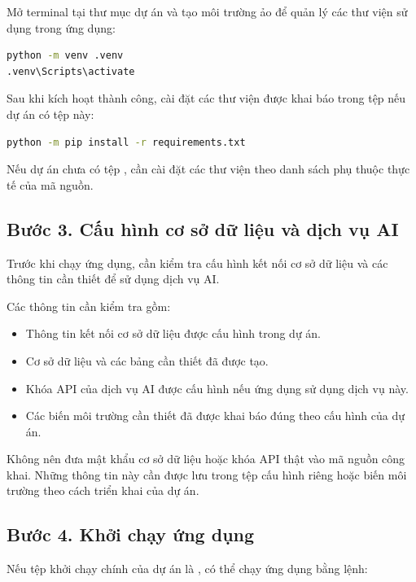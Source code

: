 Mở terminal tại thư mục dự án và tạo môi trường ảo để quản lý các
thư viện sử dụng trong ứng dụng:

\begin{lstlisting}[language=bash, caption={Tạo và kích hoạt môi trường ảo}]
python -m venv .venv
.venv\Scripts\activate
\end{lstlisting}

Sau khi kích hoạt thành công, cài đặt các thư viện được khai báo
trong tệp  nếu dự án có tệp này:

\begin{lstlisting}[language=bash, caption={Cài đặt các thư viện phụ thuộc}]
python -m pip install -r requirements.txt
\end{lstlisting}

Nếu dự án chưa có tệp , cần cài đặt các thư
viện theo danh sách phụ thuộc thực tế của mã nguồn.

\subsection*{Bước 3. Cấu hình cơ sở dữ liệu và dịch vụ AI}

Trước khi chạy ứng dụng, cần kiểm tra cấu hình kết nối cơ sở dữ
liệu và các thông tin cần thiết để sử dụng dịch vụ AI.

Các thông tin cần kiểm tra gồm:
\begin{itemize}
    \item Thông tin kết nối cơ sở dữ liệu được cấu hình trong dự án.
    \item Cơ sở dữ liệu và các bảng cần thiết đã được tạo.
    \item Khóa API của dịch vụ AI được cấu hình nếu ứng dụng sử dụng
    dịch vụ này.
    \item Các biến môi trường cần thiết đã được khai báo đúng theo
    cấu hình của dự án.
\end{itemize}

Không nên đưa mật khẩu cơ sở dữ liệu hoặc khóa API thật vào mã
nguồn công khai. Những thông tin này cần được lưu trong tệp cấu
hình riêng hoặc biến môi trường theo cách triển khai của dự án.

\subsection*{Bước 4. Khởi chạy ứng dụng}

Nếu tệp khởi chạy chính của dự án là , có thể chạy
ứng dụng bằng lệnh:

